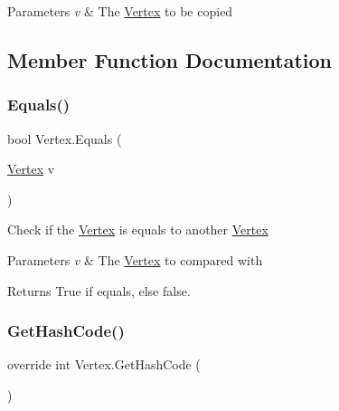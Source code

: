 \begin{DoxyParams}{Parameters}
{\em v} & The \hyperlink{structVertex}{Vertex} to be copied\\
\hline
\end{DoxyParams}


\subsection{Member Function Documentation}
\mbox{\label{structVertex_acd8c901e67ba473b75721f129eb1f7ca}} 
\subsubsection{\texorpdfstring{Equals()}{Equals()}}
{\footnotesize\ttfamily bool Vertex.\+Equals (\begin{DoxyParamCaption}\item[{\hyperlink{structVertex}{Vertex}}]{v }\end{DoxyParamCaption})\hspace{0.3cm}{\ttfamily [inline]}}



Check if the \hyperlink{structVertex}{Vertex} is equals to another \hyperlink{structVertex}{Vertex} 


\begin{DoxyParams}{Parameters}
{\em v} & The \hyperlink{structVertex}{Vertex} to compared with\\
\hline
\end{DoxyParams}
\begin{DoxyReturn}{Returns}
True if equals, else false.
\end{DoxyReturn}
\mbox{\label{structVertex_ac4e278a49041523187bd19779c6de994}} 
\subsubsection{\texorpdfstring{Get\+Hash\+Code()}{GetHashCode()}}
{\footnotesize\ttfamily override int Vertex.\+Get\+Hash\+Code (\begin{DoxyParamCaption}{ }\end{DoxyParamCaption})\hspace{0.3cm}{\ttfamily [inline]}}



